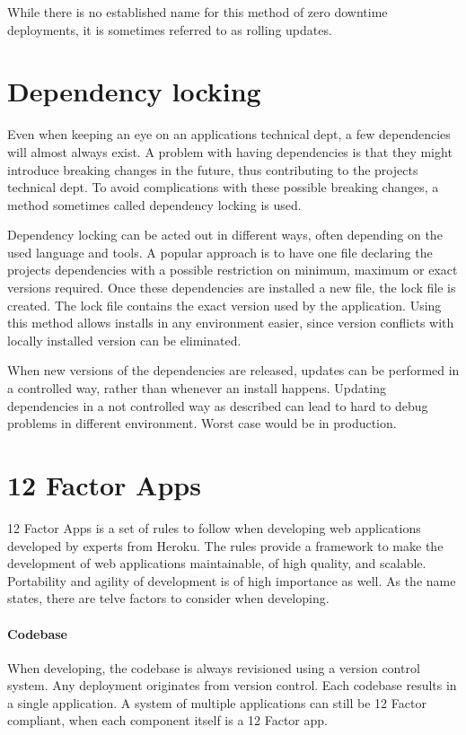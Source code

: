 While there is no established name for this method of zero downtime
deployments, it is sometimes referred to as rolling updates.

\section{Dependency locking}

Even when keeping an eye on an applications technical dept, a few dependencies
will almost always exist. A problem with having dependencies is that they might
introduce breaking changes in the future, thus contributing to the projects
technical dept. To avoid complications with these possible breaking changes, a
method sometimes called dependency locking is used.

Dependency locking can be acted out in different ways, often depending on the
used language and tools. A popular approach is to have one file declaring the
projects dependencies with a possible restriction on minimum, maximum or exact
versions required. Once these dependencies are installed a new file, the lock
file is created. The lock file contains the exact version used by the
application. Using this method allows installs in any environment easier, since
version conflicts with locally installed version can be eliminated.

When new versions of the dependencies are released, updates can be performed in
a controlled way, rather than whenever an install happens. Updating
dependencies in a not controlled way as described can lead to hard to debug
problems in different environment. Worst case would be in production.

\section{12 Factor Apps}

12 Factor Apps is a set of rules to follow when developing web applications
developed by experts from Heroku. The rules provide a framework to make the
development of web applications maintainable, of high quality, and scalable.
Portability and agility of development is of high importance as well. As the
name states, there are telve factors to consider when developing.

\paragraph{Codebase}

When developing, the codebase is always revisioned using a version control
system. Any deployment originates from version control. Each codebase results
in a single application. A system of multiple applications can still be 12
Factor compliant, when each component itself is a 12 Factor app.

